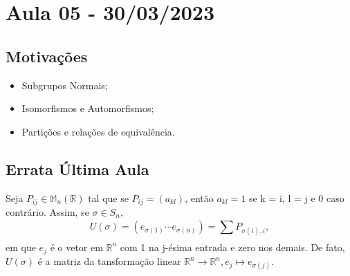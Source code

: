 \documentclass{article}
\begin{document}
\section{Aula 05 - 30/03/2023}
\subsection{Motiva\c c\~oes}
 \begin{itemize}
   \item Subgrupos Normais;
   \item Isomorfismos e Automorfismos;
   \item Parti\c c\~oes e rela\c c\~oes de equival\^encia.
 \end{itemize}
\subsection*{Errata \'Ultima Aula}
Seja $P_{ij}\in \mathbb{M}_{n}(\mathbb{R})$ tal que se $P_{ij}=(a_{kl})$, ent\~ao $a_{kl} = 1$ se k = i, l = j e 0 caso contr\'ario.
Assim, se $\sigma\in S_{n},$ 
  $$
    U(\sigma) = (e_{\sigma(1)}\cdots e_{\sigma(n)}) = \sum\limits_{}^{}P_{\sigma(i), i}, 
  $$
  em que $e_{j}$ \'e o vetor em $\mathbb{R}^{n}$ com 1 na j-\'esima entrada e zero nos demais. De fato, $U(\sigma)$ \'e a matriz
da tansforma\c c\~ao linear $\mathbb{R}^{n}\rightarrow \mathbb{R}^{n}, e_{j}\mapsto e_{\sigma(j)}.$
\end{document}

